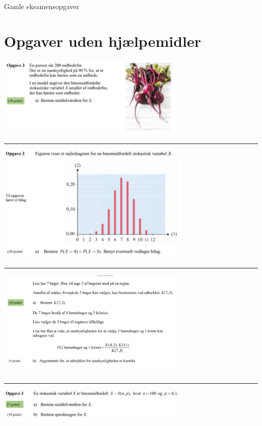 
\begin{center}
\Huge
Gamle eksamensopgaver
\end{center}

\section*{Opgaver uden hjælpemidler}
\begin{center}
	\includegraphics[width=0.7\textwidth]{Billeder/eksamensopgstat/opg1}
	\hrule
	\includegraphics[width=0.7\textwidth]{Billeder/eksamensopgstat/opg2}
	\hrule
	\includegraphics[width=0.7\textwidth]{Billeder/eksamensopgstat/opg3}
	\hrule
	\includegraphics[width=0.7\textwidth]{Billeder/eksamensopgstat/opg4}
\end{center}

